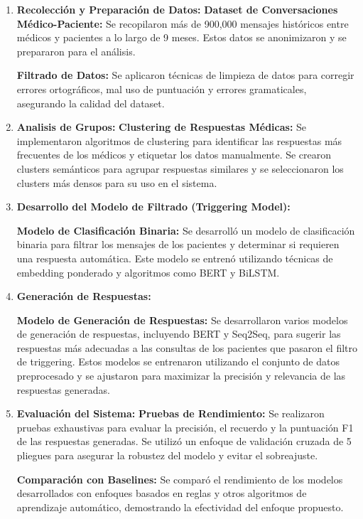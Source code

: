 		\begin{enumerate}
			\vspace{-10mm}
			\item \textbf{Recolección y Preparación de Datos:}
				\subitem \textbf{Dataset de Conversaciones Médico-Paciente:} Se recopilaron más de 900,000 mensajes históricos entre médicos y pacientes a lo largo de 9 meses. Estos datos se anonimizaron y se prepararon para el análisis.
				
				\subitem \textbf{Filtrado de Datos:} Se aplicaron técnicas de limpieza de datos para corregir errores ortográficos, mal uso de puntuación y errores gramaticales, asegurando la calidad del dataset.
			
			\item \textbf{Analisis de Grupos:}
				\subitem \textbf{Clustering de Respuestas Médicas:} Se implementaron algoritmos de clustering para identificar las respuestas más frecuentes de los médicos y etiquetar los datos manualmente. Se crearon clusters semánticos para agrupar respuestas similares y se seleccionaron los clusters más densos para su uso en el sistema.
			
			\item \textbf{Desarrollo del Modelo de Filtrado (Triggering Model):}
			
				\subitem \textbf{Modelo de Clasificación Binaria:} Se desarrolló un modelo de clasificación binaria para filtrar los mensajes de los pacientes y determinar si requieren una respuesta automática. Este modelo se entrenó utilizando técnicas de embedding ponderado y algoritmos como BERT y BiLSTM.
						
			\item \textbf{Generación de Respuestas:}
			
				\subitem \textbf{Modelo de Generación de Respuestas:} Se desarrollaron varios modelos de generación de respuestas, incluyendo BERT y Seq2Seq, para sugerir las respuestas más adecuadas a las consultas de los pacientes que pasaron el filtro de triggering. Estos modelos se entrenaron utilizando el conjunto de datos preprocesado y se ajustaron para maximizar la precisión y relevancia de las respuestas generadas.
			
			\item \textbf{Evaluación del Sistema:}
				\subitem \textbf{Pruebas de Rendimiento:} Se realizaron pruebas exhaustivas para evaluar la precisión, el recuerdo y la puntuación F1 de las respuestas generadas. Se utilizó un enfoque de validación cruzada de 5 pliegues para asegurar la robustez del modelo y evitar el sobreajuste.
				
				\subitem \textbf{Comparación con Baselines:} Se comparó el rendimiento de los modelos desarrollados con enfoques basados en reglas y otros algoritmos de aprendizaje automático, demostrando la efectividad del enfoque propuesto.
		\end{enumerate}
			
